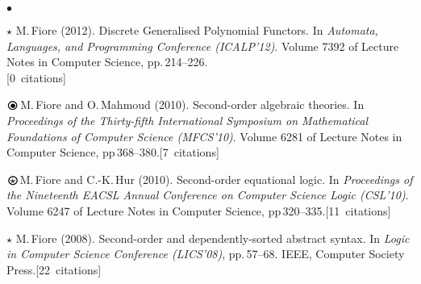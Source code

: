 \documentclass[11pt,twocolumn]{article}
\newenvironment{mybigitemize}
  {\begin{list}{$\bullet$}
  {\setlength{\topsep}{2pt}
   \setlength{\partopsep}{2pt}
   \setlength{\itemsep}{2.5pt}
   \setlength{\parsep}{2.5pt}
   \setlength{\leftmargin}{1em}
   \setlength{\labelwidth}{.5em}}}
  {\end{list}}
\newcommand{\obullet}{\mbox{$\raisebox{-.85mm}{\huge$\circ$}\hspace*{-2.6mm}\bullet$}}
\renewcommand{\ostar}{\mbox{$\raisebox{-.85mm}{\huge$\circ$}\hspace*{-2.75mm}\star$}}
\begin{document}
\begin{mybigitemize}
\item[$\star$]
  M.\,Fiore (2012).  Discrete Generalised Polynomial Functors.  In
  \emph{Automata, Languages, and Programming Conference (ICALP'12)}.
  Volume 7392 of Lecture Notes in Computer Science,
  pp.\,214--226.\\\mbox{}\hfill{\small[0~citations]}


\item[$\obullet$]
  M.\,Fiore and O.\,Mahmoud (2010).  Second-order algebraic theories.
   In \emph{Proceedings of the Thirty-fifth International Symposium
    on Mathematical Foundations of Computer Science (MFCS'10)}.  
  Volume 6281 of Lecture Notes in Computer Science,
  pp\,368--380.\mbox{}\hfill{\small[7~citations]}

\item[$\ostar$]
  M.\,Fiore and C.-K.\,Hur (2010).  Second-order equational logic. In
  \emph{Proceedings of the Nineteenth EACSL Annual Conference on Computer
    Science Logic (CSL'10)}.  Volume 6247 of Lecture Notes in
  Computer Science, pp\,320--335.\mbox{}\hfill{\small[11~citations]}



\item[$\star$]
  M.\,Fiore (2008).  Second-order and dependently-sorted abstract
  syntax.  In \emph{Logic in Computer Science Conference (LICS'08)},
  pp.\,57--68.  IEEE, Computer Society
  Press.\mbox{}\hfill{\small[22~citations]}


\end{mybigitemize}
\end{document}
